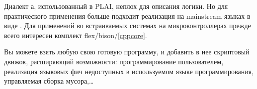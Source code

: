 \secdown

Диалект \lisp а, использованный в PLAI, неплох для описания логики. Но для
практического применения больше подходит реализация на mainstream языках в виде
.
Для применений во встраиваемых системах на микроконтроллерах прежде всего
интересен комплект flex/bison/\cpp \ref{cppcore}.

Вы можете взять любую свою готовую программу, и добавить в нее скриптовый
движок, расширяющий возможности: программирование пользователем, реализация
языковых фич недоступных в используемом языке программирования, управляемая
сборка мусора,\ldots






\secup

